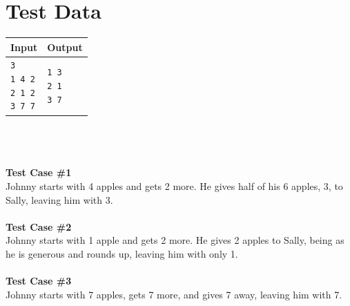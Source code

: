 \documentclass[a4paper,11pt,oneside]{article}
\begin{document}
\section{Test Data}
\begin{tabularx}{\textwidth}{|X|X|}
	\hline
	Input & Output \\ \hline
	\parbox[t]{5cm}{
	\texttt{3\\
			1 4 2\\
			2 1 2\\
			3 7 7\\
	}} & \parbox[t]{5cm}{
	\texttt{1 3\\
			2 1\\
			3 7\\
	}}\\
	\hline
\end{tabularx}
\\\\
\\
\textbf{Test Case \#1}\\
Johnny starts with 4 apples and gets 2 more. He gives half of his 6 apples, 3, to Sally,
leaving him with 3.
\\\\
\textbf{Test Case \#2}\\
Johnny starts with 1 apple and gets 2 more. He gives 2 apples to Sally, being as he is
generous and rounds up, leaving him with only 1.
\\\\
\textbf{Test Case \#3}\\
Johnny starts with 7 apples, gets 7 more, and gives 7 away, leaving him with 7.
\end{document}
